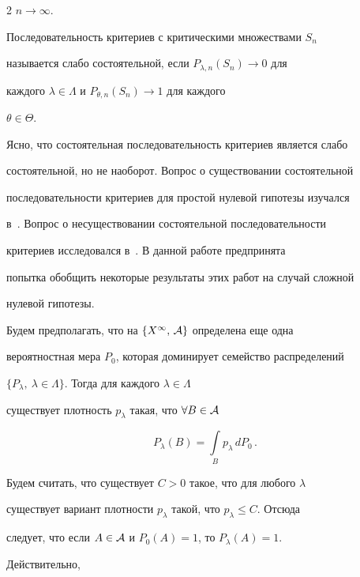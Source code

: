 \begin{multicols}{2}
$n\rightarrow\infty$.


    


    Последовательность критериев с критическими множествами $S_n$ 


называется слабо состоятельной, если $P_{\lambda,n}(S_n)\rightarrow 0$ для 


каждого $\lambda\in\Lambda$  и $P_{\theta,n}(S_n)\rightarrow 1$ для каждого 


$\theta\in\Theta$.


    


    Ясно, что состоятельная последовательность критериев является слабо 


состоятельной, но не наоборот. Вопрос о существовании состоятельной 


последовательности критериев для простой нулевой гипотезы изучался 


в~\cite{1gr}. Вопрос о несуществовании состоятельной последовательности 


критериев исследовался в~\cite{6gr, 2gr}. В данной работе предпринята 


попытка обобщить некоторые результаты этих работ на случай сложной 


нулевой гипотезы. 


    


    Будем предполагать, что на $\{X^\infty,\,\cal{A}\}$ определена еще одна 


вероятностная мера $P_0$, которая доминирует семейство распределений 


$\{P_\lambda ,\ \lambda\in\Lambda\}$. Тогда для каждого $\lambda\in\Lambda$ 


существует плотность $p_\lambda$ такая, что $\forall B\in \cal{A}$


    $$


    P_\lambda (B) = \int\limits_B p_\lambda\,dP_0\,.


    $$


    


    Будем считать, что существует $C>0$ такое, что для любого $\lambda$ 


существует вариант плотности $p_\lambda$ такой, что $p_\lambda \leq C$. Отсюда 


следует, что если $A\in \cal{A}$ и $P_0 (A)=1$, то $P_\lambda (A)=1$. 


Действительно,



\end{multicols}
